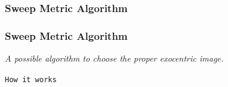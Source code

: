 \subsubsection{Sweep Metric Algorithm}
\frame
{
  \frametitle{Sweep Metric Algorithm}
  
  \emph{A possible algorithm to choose the proper \textit{exocentric} image.}
  \pause

  \begin{block} {\alert{\texttt{How it works}}}
 

    \begin{columns}
      
       {   
        }
\end{columns}
\end{block}}
